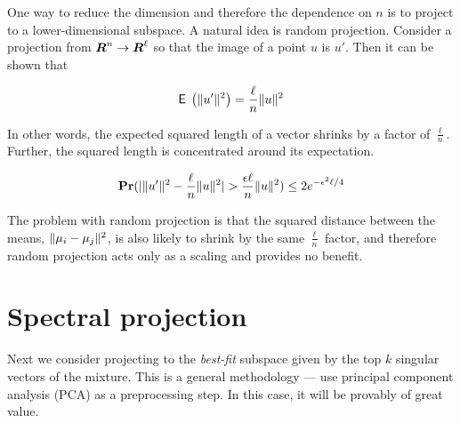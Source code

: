 \documentclass{book}
\numberwithin{exercise}{chapter}
\begin{document}
One way to reduce the dimension and therefore the dependence on $n$ is to project
to a lower-dimensional subspace. A natural idea is random
projection.  Consider a projection from $\mbox{\mbox{\boldmath $R$}}^n
\rightarrow \mbox{\mbox{\boldmath $R$}}^\ell$ so that the image of a point $u$ is $u'$.
Then it can be shown that

$$\hbox{{\sf E}\;}\left(\|u'\|^2\right) = \frac{\ell}{n}\|u\|^2$$

In other words, the expected squared length of a vector shrinks by a factor of $\frac{\ell}{n}$. Further, the squared length is concentrated around its expectation.

$$\mbox{{\bf Pr}}(|\|u'\|^2 - \frac{\ell}{n}\|u\|^2| > \frac{\epsilon
\ell}{n}\|u\|^2) \le 2e^{-\epsilon^2\ell/4}$$


The problem with random projection is that the squared distance between the
means, $\|\mu_i-\mu_j\|^2$, is also likely to shrink by the same
$\frac{\ell}{n}$ factor, and therefore random
projection acts only as a scaling and provides no benefit.

\section{Spectral projection}

Next we consider projecting to the
{\em best-fit} subspace given by the top $k$ singular vectors of the mixture.
This is a general methodology --- use principal component analysis (PCA) as a preprocessing step. In this case, it will be
provably of great value.

\begin{center}
\end{center}
\end{document}
